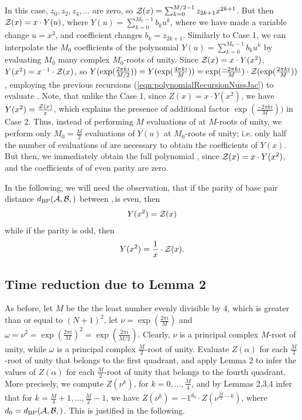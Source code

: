 \noindent
In this case, $z_0,z_2,z_4,\dots$ are zero, so
${\mathcal Z}_{}(x) = \sum_{k=0}^{M/2-1} z_{2k+1} x^{2k+1}$. But then
${\mathcal Z}_{}(x) = x \cdot Y(u)$, where
$Y(u)= \sum_{k=0}^{M_0-1} b_k u^k$, where we have made
a variable change $u=x^2$, and coefficient changes
$b_k = z_{2k+1}$. Similarly to Case 1,
we can interpolate the $M_0$ coefficients of the polynomial
$Y(u) = \displaystyle\sum_{k=0}^{M_0-1} b_k u^k$
by evaluating $M_0$ many complex $M_0$-roots
of unity.  Since ${\mathcal Z}_{}(x)=x \cdot Y(x^2)$, $Y(x^2) = x^{-1} \cdot {\mathcal Z}_{}(x)$,
so
$Y(\exp(\frac{2\pi ki}{M/2})) = Y(\exp(\frac{4\pi ki}{M})) =
\exp(\frac{-2\pi ki}{M}) \cdot
{\mathcal Z}_{}(\exp(\frac{2\pi ki}{M}))$, employing
the previous recursions (\ref{eqn:polynomialRecursionNussJac})
to evaluate .  Note, that unlike the
Case 1, since $Z(x)=x \cdot Y(x^2)$, we have
$Y(x^2)=\frac{{\mathcal Z}_{}(x)}{x}$, which explains the presence of additional factor
$\exp(\frac{-2\pi ki}{M}))$ in Case 2.  Thus, instead of
performing $M$ evaluations of \emZ{} at $M$-roots of unity,
we perform only $M_0=\frac{M}{2}$ evaluations of $Y(u)$ at
$M_0$-roots of unity; i.e. only half the number of
evaluations of \emZ{} are necessary to
obtain the coefficients of $Y(x)$. But then, we immediately obtain the
full polynomial \emZ{}, since ${\mathcal Z}_{}(x) = x \cdot Y(x^2)$, and the
coefficients of \emZ{} of even parity are zero.

In the following, we will need the observation, that if the parity of
base pair distance $\dBP{\strA,\strB}$ between \strA,\,\strB is
even, then
\begin{align}
\label{eqn:evenY}
Y(x^2) = \emZ{}
\end{align}
while if the parity is odd,
then
\begin{align}
\label{eqn:oddY}
Y(x^2) = \frac{1}{x} \cdot \emZ{}.
\end{align}

\subsection{Time reduction due to Lemma 2}
As before, let $M$ be the the least number evenly divisible by $4$, which is
greater than or equal to $(N+1)^2$, let $\nu = \exp(\frac{2 \pi i}{M})$
and $\omega=\nu^2 = \exp(\frac{2 \pi i}{M})^2 =
\exp(\frac{2 \pi i}{M/2})$. Clearly, $\nu$ is a principal complex
$M$-root of unity, while $\omega$ is a principal complex $\frac{M}{2}$-root
of unity. Evaluate $Z(\alpha)$ for each $\frac{M}{2}$-root of unity
that belongs to the first quadrant, and apply Lemma 2 to infer the values
of $Z(\alpha)$ for each $\frac{M}{2}$-root of unity that belongs to the
fourth quadrant. More precisely,
we compute $Z(\nu^k)$, for $k=0,\dots,\frac{M}{4}$, and by Lemmas 2,3,4 infer
that for $k=\frac{M}{4}+1,\dots,\frac{M}{2}-1$, we have
$Z(\nu^{k})= -1^{d_0} \cdot \overline{Z(\nu^{\frac{M}{2}-k})}$, where
$d_0 = \dBP{\strA,\strB}$. This is justified in the following.

